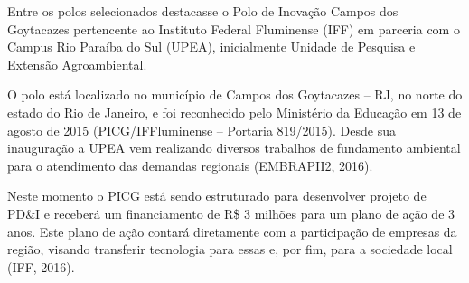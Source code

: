 Entre os polos selecionados destacasse o Polo de Inovação Campos dos Goytacazes pertencente ao Instituto Federal Fluminense (IFF) em parceria com o Campus Rio Paraíba do Sul (UPEA), inicialmente Unidade de Pesquisa e Extensão Agroambiental.

O polo está  localizado no município de Campos dos Goytacazes – RJ, no norte do estado do Rio de Janeiro, e foi reconhecido pelo Ministério da Educação em 13 de agosto de 2015 (PICG/IFFluminense – Portaria 819/2015). Desde sua inauguração a UPEA vem  realizando diversos trabalhos de fundamento ambiental para o atendimento das demandas regionais (EMBRAPII2, 2016).

Neste momento o PICG está sendo estruturado para desenvolver projeto de PD\&I e receberá um financiamento de R\$ 3 milhões para um plano de ação de 3 anos. Este plano de ação contará diretamente com a participação de empresas da região, visando transferir tecnologia para essas e, por fim, para a sociedade local (IFF, 2016).

